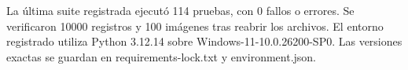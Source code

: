 La última suite registrada ejecutó 114 pruebas, con 0 fallos o errores. Se verificaron 10000 registros y 100 imágenes tras reabrir los archivos. El entorno registrado utiliza Python 3.12.14 sobre Windows-11-10.0.26200-SP0. Las versiones exactas se guardan en requirements-lock.txt y environment.json.
